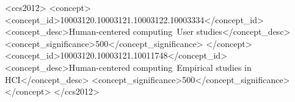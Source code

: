 \documentclass[acmsmall]{acmart}
\begin{document}
%
%
\begin{CCSXML}
<ccs2012>
    <concept>
       <concept_id>10003120.10003121.10003122.10003334</concept_id>
       <concept_desc>Human-centered computing~User studies</concept_desc>
       <concept_significance>500</concept_significance>
    </concept>
       <concept_id>10003120.10003121.10011748</concept_id>
       <concept_desc>Human-centered computing~Empirical studies in HCI</concept_desc>
       <concept_significance>500</concept_significance>
       </concept>
 </ccs2012>
\end{CCSXML}




\maketitle







% 






\begin{acks}
    
\end{acks}




\appendix
% 
\end{document}
